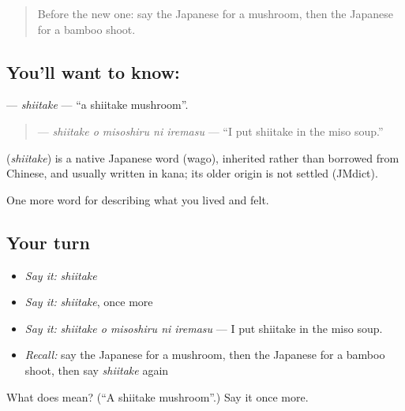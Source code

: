 \label{lesson:JA-C494-shiitake}



\begin{quote}
Before the new one: say the Japanese for a mushroom, then the Japanese for a bamboo shoot.
\end{quote}

\subsection*{You'll want to know: }
\textbf{} — \emph{shiitake} — \textquotedblleft{}a shiitake mushroom\textquotedblright{}.

\begin{quote}
\textbf{  } — \emph{shiitake o misoshiru ni iremasu} — \textquotedblleft{}I put shiitake in the miso soup.\textquotedblright{}
\end{quote}

\begin{cousinweb}
\textbf{} (\emph{shiitake}) is a native Japanese word (wago), inherited rather than borrowed from Chinese, and usually written in kana; its older origin is not settled (JMdict).
\end{cousinweb}

\begin{grammarlens}[title={What you've built}]
One more word for describing what you lived and felt.
\end{grammarlens}

\subsection*{Your turn}
\begin{itemize}
\raggedright
  \item \emph{Say it:} \emph{shiitake}
  \item \emph{Say it:} \emph{shiitake}, once more
  \item \emph{Say it:} \emph{shiitake o misoshiru ni iremasu} — I put shiitake in the miso soup.
  \item \emph{Recall:} say the Japanese for a mushroom, then the Japanese for a bamboo shoot, then say \emph{shiitake} again
\end{itemize}

\begin{tcolorbox}[breakable,colback=teal!4,colframe=teal!35!black,title={Before you move on}]
What does  mean? (\textquotedblleft{}A shiitake mushroom\textquotedblright{}.) Say it once more.
\end{tcolorbox}
